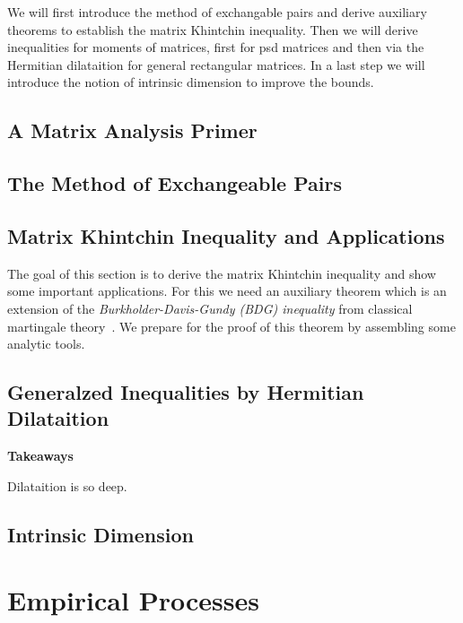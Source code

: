 \documentclass[12pt]{scrreport}
\newenvironment{takeaways}
  {
   \begin{lrbox}{\selvestebox}%
   \begin{minipage}{15cm}
     \textbf{Takeaways}
   }
  {\end{minipage}\end{lrbox}%
   \begin{center}
\setlength\fboxsep{.5cm}
   \colorbox[HTML]{F8E0E0}{\usebox{\selvestebox}}
   \end{center}}
\theoremstyle{remark}
\theoremstyle{plain}
\begin{document}
  We will first introduce the method of exchangable pairs and derive auxiliary theorems to establish the matrix Khintchin inequality.
  Then we will derive inequalities for moments of matrices, first for psd matrices and then via the Hermitian dilataition for general rectangular matrices. In a last step we will introduce the notion of intrinsic dimension to improve the bounds.

  \section{A Matrix Analysis Primer}
  
  \section{The Method of Exchangeable Pairs}
  
 \section{Matrix Khintchin Inequality and Applications}
 The goal of this section is to derive the matrix Khintchin inequality and show some important applications.
 For this we need an auxiliary theorem which is an extension of the 
 \textit{Burkholder-Davis-Gundy (BDG) inequality} from classical martingale theory~\cite{Burkholder1973}.
  We prepare for the proof of this theorem by assembling some analytic tools.
  
  \section{Generalzed Inequalities by Hermitian Dilataition}
  
  
  \begin{takeaways}
    Dilataition is so deep.
    \lipsum[3]
  \end{takeaways}
  
  \section{Intrinsic Dimension}
  


\chapter{Empirical Processes}
\end{document}
